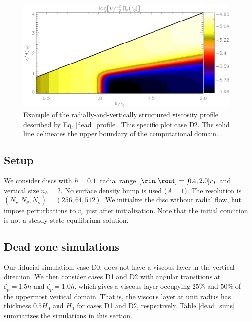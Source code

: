 \begin{figure}
  \centering
  \includegraphics[width=\linewidth]{figures/pdisk_visc2d_dead}
  \caption{Example of the radially-and-vertically structured viscosity
    profile described by Eq. \ref{dead_profile}. 
    This specific plot case D2. The solid line delineates the upper
    boundary of the computational domain. 
    \label{visc2d_dead}}
\end{figure}

\subsection{Setup}
We consider discs with $h=0.1$, radial range
$[\rin,\rout]=[0.4,2.0]r_0$ and vertical size $n_h=2$. No surface
density bump is used ($A=1$). The resolution
is $(N_r,N_\theta,N_\phi)=(256,64,512)$. We initialize the disc
without radial flow, but impose perturbations to $v_r$ just after
initialization. Note that the initial condition is not a steady-state
equilibrium solution.   

\subsection{Dead zone simulations}
Our fiducial simulation, case D0, does not have a viscous layer in the
vertical direction. We then consider cases D1 
and D2 with angular transitions at $\zeta_\nu=1.5h$ and
$\zeta_\nu=1.0h$, which gives a viscous layer occupying
$25\%$ and $50\%$ of the uppermost vertical domain. That is, the 
viscous layer at unit radius has thickness $0.5H_0$ and $H_0$ for
cases D1 and D2, respectively. Table \ref{dead_sims} summarizes the
simulations in this section. 
 
